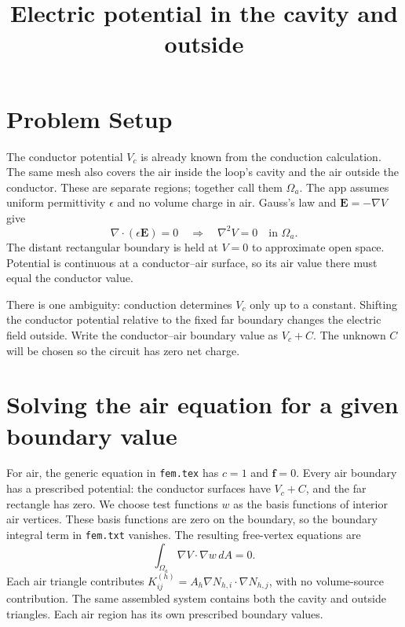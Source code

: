 \documentclass[11pt]{article}
\title{Electric potential in the cavity and outside}
\author{}
\date{}
\begin{document}
\maketitle

\section{Problem Setup}
The conductor potential $V_c$ is already known from the conduction
calculation. The same mesh also covers the air inside the loop's cavity
and the air outside the conductor. These are separate regions; together
call them $\Omega_a$. The app assumes uniform permittivity $\epsilon$
and no volume charge in air. Gauss's law and
$\bm E=-\nabla V$ give
\begin{equation}
 \nabla\cdot(\epsilon\bm E)=0
 \quad\Longrightarrow\quad
 \nabla^2V=0\quad\text{in }\Omega_a.
\end{equation}
The distant rectangular boundary is held at $V=0$ to approximate open
space. Potential is continuous at a conductor--air surface, so its air
value there must equal the conductor value.

There is one ambiguity: conduction determines $V_c$ only up to a
constant. Shifting the conductor potential relative to the fixed far
boundary changes the electric field outside. Write the conductor--air
boundary value as $V_c+C$. The unknown $C$ will be chosen so the
circuit has zero net charge.

\section{Solving the air equation for a given boundary value}
For air, the generic equation in \texttt{fem.tex} has $c=1$ and
$\bm f=0$. Every air boundary has a prescribed potential: the
conductor surfaces have $V_c+C$, and the far rectangle has zero.
We choose test functions $w$ as the basis functions of interior air vertices.
These basis functions are zero on the boundary, so the boundary integral
term in \texttt{fem.txt} vanishes.
The resulting free-vertex equations are
\begin{equation}
 \int_{\Omega_a}\nabla V\cdot\nabla w\,dA=0.
\end{equation}
Each air triangle contributes
$K^{(h)}_{ij}=A_h\nabla N_{h,i}\cdot\nabla N_{h,j}$, with no volume-source
contribution. The same assembled system contains both the cavity
and outside triangles. Each air region has its own prescribed
boundary values.
\end{document}
